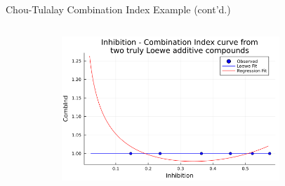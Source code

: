\documentclass{beamer}
\begin{document}
\begin{frame}[t]{Chou-Tulalay Combination Index Example (cont'd.)}
\begin{columns}
\begin{column}{0.5\textwidth}
\begin{figure}
\begin{subfigure}{0.9\textwidth}
                \end{subfigure}
                \begin{subfigure}{0.9\textwidth}
                    \centering
                    \includegraphics[width=0.9\textwidth, height = 0.35\textheight]{figs/CI-bias-nonlog.png}
                \end{subfigure}
            \end{figure} 
        \end{column}
    \end{columns}
\end{frame}
\end{document}
